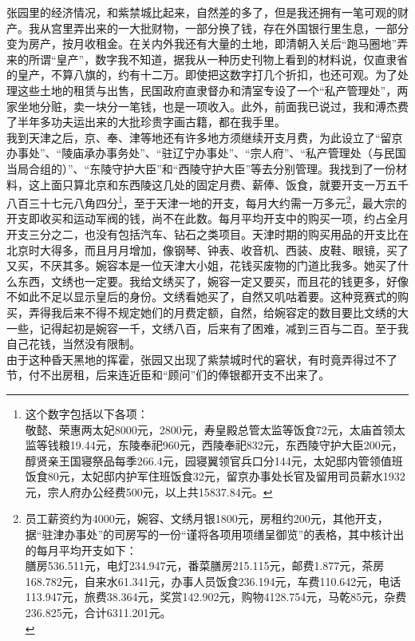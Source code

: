 张园里的经济情况，和紫禁城比起来，自然差的多了，但是我还拥有一笔可观的财产。我从宫里弄出来的一大批财物，一部分换了钱，存在外国银行里生息，一部分变为房产，按月收租金。在关内外我还有大量的土地，即清朝入关后“跑马圈地”弄来的所谓“皇产”，数字我不知道，据我从一种历史刊物上看到的材料说，仅直隶省的皇产，不算八旗的，约有十二万。即使把这数字打几个折扣，也还可观。为了处理这些土地的租赁与出售，民国政府直隶督办和清室专设了一个“私产管理处”，两家坐地分赃，卖一块分一笔钱，也是一项收入。此外，前面我已说过，我和溥杰费了半年多功夫运出来的大批珍贵字画古籍，都在我手里。\\

我到天津之后，京、奉、津等地还有许多地方须继续开支月费，为此设立了“留京办事处”、“陵庙承办事务处”、“驻辽宁办事处”、“宗人府”、“私产管理处（与民国当局合组的）”、“东陵守护大臣”和“西陵守护大臣”等去分别管理。我找到了一份材料，这上面只算北京和东西陵这几处的固定月费、薪俸、饭食，就要开支一万五千八百三十七元八角四分\footnote{这个数字包括以下各项：\\
	敬懿、荣惠两太妃8000元，2800元，寿皇殿总管太监等饭食72元，太庙首领太监等钱粮19.44元，东陵奉祀960元，西陵奉祀832元，东西陵守护大臣200元，醇贤亲王国寝祭品每季266.4元，园寝翼领官兵口分144元，太妃邸内管领值班饭食80元，太妃邸内护军住班饭食32元，留京办事处长官及留用司员薪水1932元，宗人府办公经费500元，以上共15837.84元。}，至于天津一地的开支，每月大约需一万多元\footnote{员工薪资约为4000元，婉容、文绣月银1800元，房租约200元，其他开支，据“驻津办事处”的司房写的一份“谨将各项用项缮呈御览”的表格，其中核计出的每月平均开支如下：\\
	膳房536.511元，电灯234.947元，番菜膳房215.115元，邮费1.877元，茶房168.782元，自来水61.341元，办事人员饭食236.194元，车费110.642元，电话113.947元，旅费38.364元，奖赏142.902元，购物4128.754元，马乾85元，杂费236.825元，合计6311.201元。\\}，最大宗的开支即收买和运动军阀的钱，尚不在此数。每月平均开支中的购买一项，约占全月开支三分之二，也没有包括汽车、钻石之类项目。天津时期的购买用品的开支比在北京时大得多，而且月月增加，像钢琴、钟表、收音机、西装、皮鞋、眼镜，买了又买，不厌其多。婉容本是一位天津大小姐，花钱买废物的门道比我多。她买了什么东西，文绣也一定要。我给文绣买了，婉容一定又要买，而且花的钱更多，好像不如此不足以显示皇后的身份。文绣看她买了，自然又叽咕着要。这种竞赛式的购买，弄得我后来不得不规定她们的月费定额，自然，给婉容定的数目要比文绣的大一些，记得起初是婉容一千，文绣八百，后来有了困难，减到三百与二百。至于我自己花钱，当然没有限制。\\

由于这种昏天黑地的挥霍，张园又出现了紫禁城时代的窘状，有时竟弄得过不了节，付不出房租，后来连近臣和“顾问”们的俸银都开支不出来了。\\

